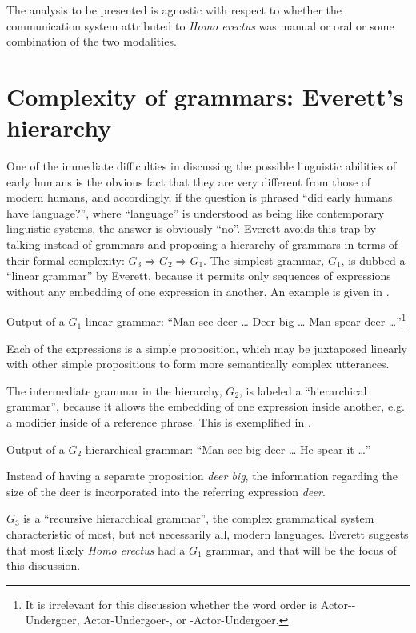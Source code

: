 \documentclass[output=paper,colorlinks,citecolor=brown]{langscibook}
\begin{document}
The analysis to be presented is agnostic with respect to whether the communication system attributed to \emph{Homo erectus} was manual or oral or some combination of the two modalities.

\section{Complexity of grammars: Everett’s hierarchy}\label{sec:vanvalin:2}
One of the immediate difficulties in discussing the possible linguistic abilities of early humans is the obvious fact that they are very different from those of modern humans, and accordingly, if the question is phrased ``did early humans have language?'', where ``language'' is understood as being like contemporary linguistic systems, the answer is obviously ``no''.  Everett avoids this trap by talking instead of grammars and proposing a hierarchy of grammars in terms of their formal complexity: $G_3 \Rightarrow G_2 \Rightarrow G_1$.  The simplest grammar, $G_1$, is dubbed a ``linear grammar'' by Everett, because it permits only sequences of expressions without any embedding of one expression in another. An example is given in .

\ea \label{vanvalin_example_1}
Output of a $G_1$ linear grammar: ``Man see deer \ldots{}  Deer big \ldots{}  Man spear deer \ldots''\footnote{It is irrelevant for this discussion whether the word order is Actor--Undergoer, Actor-Undergoer-, or -Actor-Undergoer.}
\z

Each of the expressions is a simple proposition, which may be juxtaposed linearly with other simple propositions to form more semantically complex utterances.

The intermediate grammar in the hierarchy, $G_2$, is labeled a ``hierarchical grammar'', because it allows the embedding of one expression inside another, e.g. a modifier inside of a reference phrase.  This is exemplified in .

\ea \label{vanvalin_example_2}
Output of a $G_2$ hierarchical grammar: ``Man see big deer \ldots{}  He spear it \ldots''
\z

Instead of having a separate proposition \emph{deer big}, the information regarding the size of the deer is incorporated into the referring expression \emph{deer}.

$G_3$ is a ``recursive hierarchical grammar'', the complex grammatical system characteristic of most, but not necessarily all, modern languages.  Everett suggests that most likely \emph{Homo erectus} had a $G_1$ grammar, and that will be the focus of this discussion.
\end{document}
